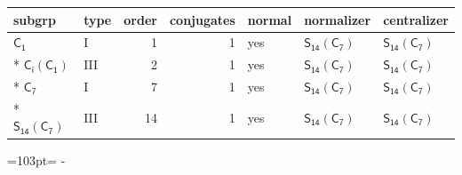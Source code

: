 \documentclass[10pt,a4paper]{article}
\newcommand{\needspace}[1]{\par\penalty-100\begingroup\dimen0=#1\relax\dimen2=\pagegoal
  \advance\dimen2-\pagetotal\ifdim\dimen0>\dimen2\relax\ifdim\dimen2>0pt\vfil\break\fi\fi
  \endgroup}
\numberwithin{equation}{section}
\newcommand{\grp}[1]{\mathsf{#1}}
\begin{document}
{\small\begin{longtable}{@{}llrrlll@{}}\toprule
subgrp & type & order & conjugates & normal & normalizer & centralizer\\\midrule\endhead
\bottomrule\endfoot\endlastfoot
\href{../../../rotation/data/pdf/C1.pdf}{$\grp{C_{1}}$} & I & 1 & 1 & yes & \href{S14-C7.pdf}{$\grp{S_{14}}(\grp{C_{7}})$} & \href{S14-C7.pdf}{$\grp{S_{14}}(\grp{C_{7}})$}\\*
\href{S2-C1.pdf}{$\grp{C_{i}}(\grp{C_{1}})$} & III & 2 & 1 & yes & \href{S14-C7.pdf}{$\grp{S_{14}}(\grp{C_{7}})$} & \href{S14-C7.pdf}{$\grp{S_{14}}(\grp{C_{7}})$}\\*
\href{../../../rotation/data/pdf/C7.pdf}{$\grp{C_{7}}$} & I & 7 & 1 & yes & \href{S14-C7.pdf}{$\grp{S_{14}}(\grp{C_{7}})$} & \href{S14-C7.pdf}{$\grp{S_{14}}(\grp{C_{7}})$}\\*
\href{S14-C7.pdf}{$\grp{S_{14}}(\grp{C_{7}})$} & III & 14 & 1 & yes & \href{S14-C7.pdf}{$\grp{S_{14}}(\grp{C_{7}})$} & \href{S14-C7.pdf}{$\grp{S_{14}}(\grp{C_{7}})$}\\
\bottomrule\end{longtable}}
\needspace{103pt}
\end{document}
